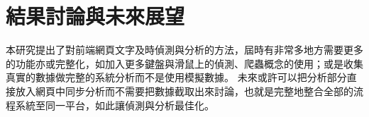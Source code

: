 \chapter{結果討論與未來展望}
本研究提出了對前端網頁文字及時偵測與分析的方法，屆時有非常多地方需要更多的功能亦或完整化，如加入更多鍵盤與滑鼠上的偵測、爬蟲概念的使用；或是收集真實的數據做完整的系統分析而不是使用模擬數據。
未來或許可以把分析部分直接放入網頁中同步分析而不需要把數據截取出來討論，也就是完整地整合全部的流程系統至同一平台，如此讓偵測與分析最佳化。
